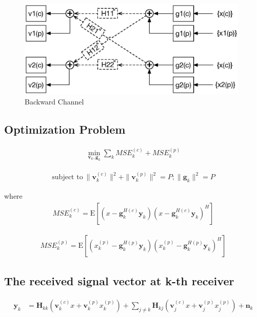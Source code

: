 \documentclass[11pt, oneside]{article}   	%
\begin{document}
\begin{figure}[h]
    \centering
    \centerline{\includegraphics[width=110mm]{backward_channel}}
    \caption{Backward Channel}
\end{figure} 

\newpage

\subsection{Optimization Problem}
\begin{align*}
\min_{\textbf{v}_{k} ,\textbf{g}_{k}} \displaystyle\sum_{k} MSE^{(c)}_{k}+MSE^{(p)}_{k}
\end{align*}

\begin{align*}
\text{subject to}  \ 	\|	\textbf{v}^{(c)}_{k}	\|^{2}	+\|	\textbf{v}^{(p)}_{k}\|^{2}= P; \| \textbf{g}_{k}	\|^{2} = P
\end{align*}

where
\begin{align*}
MSE^{(c)}_{k} = \mathrm{E}	[	(	x-\textbf{g}^{H(c)}_{k}	\textbf{y}_{k}	)(x-\textbf{g}^{H(c)}_{k}	\textbf{y}_{k})^{H}	]
\end{align*}

\begin{align*}
MSE^{(p)}_{k} = \mathrm{E}	[	(	x^{(p)}_{k}-\textbf{g}^{H(p)}_{k}	\textbf{y}_{k}	)(x^{(p)}_{k}-\textbf{g}^{H(p)}_{k}	\textbf{y}_{k})^{H}	]
\end{align*}





\subsection{The received signal vector at k-th receiver}
\begin{align*}
\textbf{y}_{k} &= \textbf{H}_{kk}
			(\textbf{v}^{(c)}_{k}x
			+\textbf{v}^{(p)}_{k}x^{(p)}_{k})
			+\displaystyle\sum_{j \neq k}\textbf{H}_{kj}(\textbf{v}^{(c)}_{j}x+\textbf{v}^{(p)}_{j}x^{(p)}_{j})
			+\textbf{n}_{k}
\end{align*}
\end{document}
